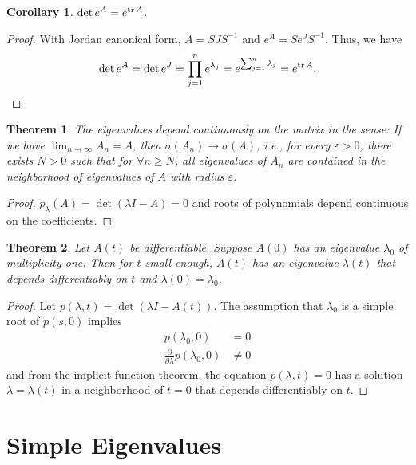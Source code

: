 \documentclass[11pt]{book}
\newtheorem{theorem}{Theorem}[section]
\newtheorem{corollary}{Corollary}[theorem]
\theoremstyle{definition}
\numberwithin{equation}{chapter}
\begin{document}
\medskip

\begin{corollary}\label{exponential_trace_corollary}
$\det e^A = e^{\tr A}$.
\end{corollary}
\begin{proof}
With Jordan canonical form, $A = SJS^{-1}$ and $e^A = Se^JS^{-1}$. Thus, we have
\begin{align*}
    \det e^A = \det e^J = \prod^n_{j=1} e^{\lambda_j} = e^{\sum^n_{j=1}\lambda_j} = e^{\tr A}.
\end{align*}
\end{proof}

\medskip

\begin{theorem}
The eigenvalues depend continuously on the matrix in the sense: If we have $\lim_{n\to\infty}A_n = A$, then $\sigma(A_n)\to \sigma(A)$, i.e., for every $\varepsilon > 0$, there exists $N > 0$ such that for $\forall n\geq N$, all eigenvalues of $A_n$ are contained in the neighborhood of eigenvalues of $A$ with radius $\varepsilon$.
\end{theorem}
\begin{proof}
$p_\lambda(A) = \det(\lambda I - A) = 0$ and roots of polynomials depend continuous on the coefficients.
\end{proof}

\medskip

\begin{theorem}
Let $A(t)$ be differentiable. Suppose $A(0)$ has an eigenvalue $\lambda_0$ of multiplicity one. Then for $t$ small enough, $A(t)$ has an eigenvalue $\lambda(t)$ that depends differentiably on $t$ and $\lambda(0) = \lambda_0$.
\end{theorem}
\begin{proof}
Let $p(\lambda, t) = \det (\lambda I - A(t))$. The assumption that $\lambda_0$ is a simple root of $p(s,0)$ implies 
\begin{align*}
    p(\lambda_0,0) & = 0 \\
    \frac{\partial}{\partial \lambda}p(\lambda_0,0) & \neq 0
\end{align*}
and from the implicit function theorem, the equation $p(\lambda,t) = 0$ has a solution $\lambda = \lambda(t)$ in a neighborhood of $t=0$ that depends differentiably on $t$.
\end{proof}

\medskip

\section{Simple Eigenvalues}
\end{document}
